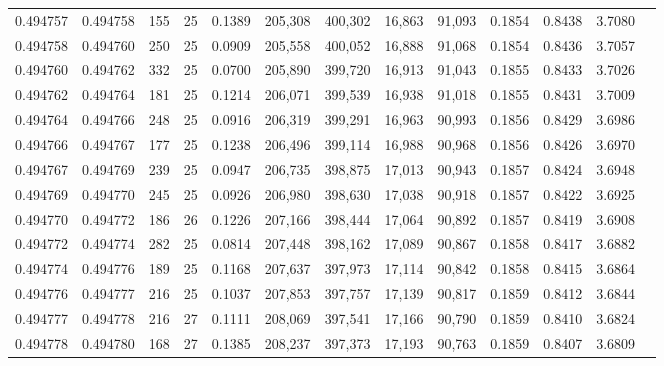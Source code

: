 \begin{tabular}{rrrrrrrrrrrrr}
0.494757 & 0.494758 & 155 &  25 &                                     0.1389 & 205,308 & 400,302 &  16,863 &  91,093 & 0.1854 & 0.8438 & 3.7080 \\
0.494758 & 0.494760 & 250 &  25 &                                     0.0909 & 205,558 & 400,052 &  16,888 &  91,068 & 0.1854 & 0.8436 & 3.7057 \\
0.494760 & 0.494762 & 332 &  25 &                                     0.0700 & 205,890 & 399,720 &  16,913 &  91,043 & 0.1855 & 0.8433 & 3.7026 \\
0.494762 & 0.494764 & 181 &  25 &                                     0.1214 & 206,071 & 399,539 &  16,938 &  91,018 & 0.1855 & 0.8431 & 3.7009 \\
0.494764 & 0.494766 & 248 &  25 &                                     0.0916 & 206,319 & 399,291 &  16,963 &  90,993 & 0.1856 & 0.8429 & 3.6986 \\
0.494766 & 0.494767 & 177 &  25 &                                     0.1238 & 206,496 & 399,114 &  16,988 &  90,968 & 0.1856 & 0.8426 & 3.6970 \\
0.494767 & 0.494769 & 239 &  25 &                                     0.0947 & 206,735 & 398,875 &  17,013 &  90,943 & 0.1857 & 0.8424 & 3.6948 \\
0.494769 & 0.494770 & 245 &  25 &                                     0.0926 & 206,980 & 398,630 &  17,038 &  90,918 & 0.1857 & 0.8422 & 3.6925 \\
0.494770 & 0.494772 & 186 &  26 &                                     0.1226 & 207,166 & 398,444 &  17,064 &  90,892 & 0.1857 & 0.8419 & 3.6908 \\
0.494772 & 0.494774 & 282 &  25 &                                     0.0814 & 207,448 & 398,162 &  17,089 &  90,867 & 0.1858 & 0.8417 & 3.6882 \\
0.494774 & 0.494776 & 189 &  25 &                                     0.1168 & 207,637 & 397,973 &  17,114 &  90,842 & 0.1858 & 0.8415 & 3.6864 \\
0.494776 & 0.494777 & 216 &  25 &                                     0.1037 & 207,853 & 397,757 &  17,139 &  90,817 & 0.1859 & 0.8412 & 3.6844 \\
0.494777 & 0.494778 & 216 &  27 &                                     0.1111 & 208,069 & 397,541 &  17,166 &  90,790 & 0.1859 & 0.8410 & 3.6824 \\
0.494778 & 0.494780 & 168 &  27 &                                     0.1385 & 208,237 & 397,373 &  17,193 &  90,763 & 0.1859 & 0.8407 & 3.6809 \\

\end{tabular}
